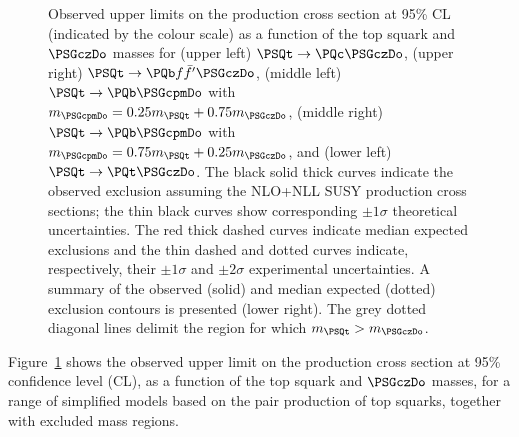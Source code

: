 \begin{figure}[htbp]
    \caption{ Observed upper limits on the production cross section at
      95\% CL (indicated by the colour scale) as a function of the
      top squark and $\PSGczDo$ masses for
      (upper left) $\PSQt \to\PQc\PSGczDo$,
      (upper right) $\PSQt \to{\PQb \ffbp}\PSGczDo$,
      (middle left) $\PSQt \to\PQb\PSGcpmDo$ with $m_{\PSGcpmDo} = 0.25m_{\PSQt} + 0.75m_{\PSGczDo}$,
      (middle right) $\PSQt \to\PQb\PSGcpmDo$ with $m_{\PSGcpmDo} = 0.75m_{\PSQt} + 0.25m_{\PSGczDo}$, and
      (lower left) $\PSQt \to\PQt \PSGczDo$.
      The black solid thick curves indicate the observed exclusion
      assuming the NLO+NLL SUSY production cross sections; the thin
      black curves show corresponding ${\pm}1\sigma$ theoretical
      uncertainties. The red thick dashed curves indicate median
      expected exclusions and the thin dashed and dotted
      curves indicate, respectively, their ${\pm}1 \sigma$ and
      ${\pm}2\sigma$ experimental uncertainties. A summary of the
      observed (solid) and median expected (dotted) exclusion contours
      is presented (lower right). The grey dotted diagonal lines
      delimit the region for which $m_{\PSQt} > m_{\PSGczDo}$.
      \label{fig:limits-sms}
    }
\end{figure}

Figure~\ref{fig:limits-sms} shows the observed upper limit on the
production cross section at 95\% confidence level (CL), as a function
of the top squark and $\PSGczDo$ masses, for a range of simplified
models based on the pair production of top squarks, together with
excluded mass regions.


